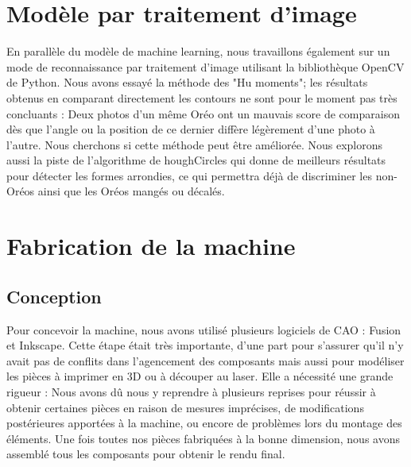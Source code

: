 \documentclass{article}
\begin{document}
\section{Modèle par traitement d'image}
En parallèle du modèle de machine learning, nous travaillons également sur un mode de reconnaissance par traitement d'image utilisant la bibliothèque OpenCV de Python. Nous avons essayé la méthode des "Hu moments"; les résultats obtenus en comparant directement les contours ne sont pour le moment pas très concluants : Deux photos d'un même Oréo ont un mauvais score de comparaison dès que l'angle ou la position de ce dernier diffère légèrement d'une photo à l'autre. Nous cherchons si cette méthode peut être améliorée. Nous explorons aussi la piste de l’algorithme de houghCircles qui donne de meilleurs résultats pour détecter les formes arrondies, ce qui permettra déjà de discriminer les non-Oréos ainsi que les Oréos mangés ou décalés.



\section{Fabrication de la machine}
\subsection{Conception}
Pour concevoir la machine, nous avons utilisé plusieurs logiciels de CAO : Fusion et Inkscape.
Cette étape était très importante, d'une part pour s'assurer qu'il n'y avait pas de conflits dans l'agencement des composants mais aussi pour modéliser les pièces à imprimer en 3D ou à découper au laser.
Elle a nécessité une grande rigueur :  Nous avons dû nous y reprendre à plusieurs reprises pour réussir à obtenir certaines pièces en raison de mesures imprécises, de modifications postérieures apportées à la machine, ou encore de problèmes lors du montage des éléments.
Une fois toutes nos pièces fabriquées à la bonne dimension, nous avons assemblé tous les composants pour obtenir le rendu final.
\end{document}
